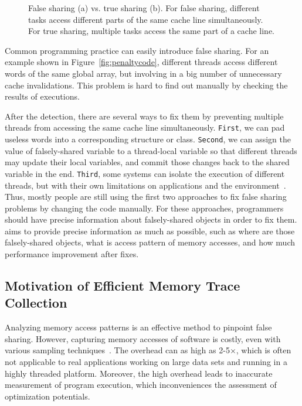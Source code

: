 \begin{figure}[htbp]
\centering
{}%
\hspace{30pt}
%
\caption{False sharing (a) vs. true sharing (b). For false sharing, different tasks access different parts of the same cache line simultaneously. For true sharing, multiple tasks access the same part of a cache line.\label{fig:falsesharing}}
\end{figure}

Common programming practice can easily introduce false sharing. For an example shown in Figure~\ref{fig:penaltycode}, different threads access different words of the same global array, but involving in a big number of unnecessary cache invalidations. This problem is hard to find out manually by checking the results of executions.  

After the detection, there are several ways to fix them by preventing multiple threads from accessing the same cache line simultaneously. {\tt First},  we can pad useless words into a corresponding structure or class. {\tt Second}, we can assign the value of falsely-shared variable to a thread-local variable so that different threads may update their local variables, and commit those changes back to the shared variable in the end. {\tt Third},  some systems can isolate the execution of different threads, but with their own limitations on applications and the environment~\cite{Sheriff, OSdetection}. 
Thus, mostly people are still using the first two approaches to fix false sharing problems by changing the code manually. For these approaches, programmers should have precise information about falsely-shared objects in order to fix them. \cheetah{} aims to provide precise information as much as possible, such as where are those falsely-shared objects, what is access pattern of memory accesses, and how much performance improvement after fixes. 


\sloppy
\subsection{Motivation of Efficient Memory Trace Collection}
Analyzing memory access patterns is an effective method to pinpoint false sharing. However, capturing memory accesses of software is costly, even with various sampling techniques~\cite{}. The overhead can as high as 2-5$\times$, which is often not applicable to real applications working on large data sets and running in a highly threaded platform. Moreover, the high overhead leads to inaccurate measurement of program execution, which inconveniences the assessment of optimization potentials.

